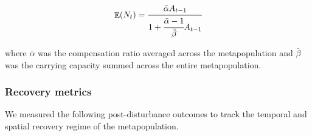 \documentclass[
]{article}
\begin{document}
\begin{align}
{\mathop{\mathrm{\mathbb{E}}}(N_t)}=\cfrac{\bar{\alpha}{A}_{t-1}}{1+\cfrac{\bar{\alpha}-1}{\bar{\beta}}{A}_{t-1}}
\end{align}

where \(\bar{\alpha}\) was the compensation ratio averaged across the
metapopulation and \(\bar{\beta}\) was the carrying capacity summed
across the entire metapopulation.

\hypertarget{recovery-metrics}{%
\subsubsection{Recovery metrics}\label{recovery-metrics}}

We measured the following post-disturbance outcomes to track the
temporal and spatial recovery regime of the metapopulation.
\end{document}
